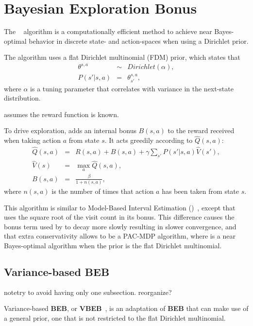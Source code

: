 \section{Bayesian Exploration Bonus}

The ~\cite{kolter09} algorithm is a computationally efficient method to achieve near Bayes-optimal behavior in discrete state- and action-spaces when using a Dirichlet prior.

The algorithm uses a flat Dirichlet multinomial (FDM) prior, which states that
\begin{eqnarray}
\theta^{s,a}&\sim&Dirichlet(\alpha),\\
P(s'|s,a)&=&\theta^{s,a}_{s'},
\end{eqnarray}
where $\alpha$ is a tuning parameter that correlates with variance in the next-state distribution.

 assumes the reward function is known.

To drive exploration,  adds an internal bonus $B(s,a)$ to the reward received when taking action $a$ from state $s$. It acts greedily according to $\hat Q(s,a)$:
\begin{eqnarray}
\hat Q(s,a)&=&R(s,a)+B(s,a)+\gamma \sum_{s'} P(s'|s,a)\hat V(s'),\\
\hat V(s)&=& \max_a \hat Q(s, a),\\
\label{eqn:rel:beb:bonus}
B(s,a)&=&\frac\beta{1+n(s,a)},
\end{eqnarray}
where $n(s,a)$ is the number of times that action $a$ has been taken from state $s$.

This algorithm is similar to Model-Based Interval Estimation ()~\cite{strehl06}, except that  uses the square root of the visit count in its bonus. This difference causes the bonus term used by  to decay more slowly resulting in slower convergence, and that extra conservativity allows  to be a PAC-MDP algorithm, where  is a near Bayes-optimal algorithm when the prior is the flat Dirichlet multinomial.

\subsection{Variance-based BEB}

note{try to avoid having only one subsection.  reorganize?}

Variance-based {\bf BEB}, or {\bf VBEB}~\cite{sorg10}, is an adaptation of {\bf BEB} that can make use of a general prior, one that is not restricted to the flat Dirichlet multinomial.

